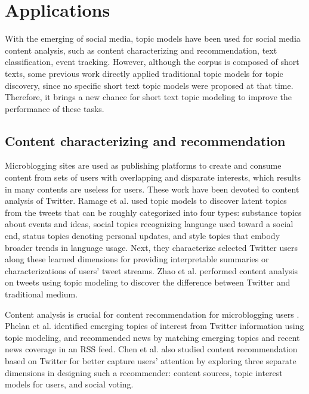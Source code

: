 \documentclass[10pt,journal,compsoc]{IEEEtran}
\begin{document}
{\section{Applications}

With the emerging of social media, topic models have been used for social media content analysis, such as content characterizing and recommendation, text classification, event tracking. However, although the corpus is composed of short texts, some previous work directly applied traditional topic models for topic discovery, since no specific short text topic models were proposed at that time. Therefore, it brings a new chance for short text topic modeling to improve the performance of these tasks.


\subsection{Content characterizing and recommendation}

Microblogging sites are used as publishing platforms to create and consume content from sets of users with overlapping and disparate interests, which results in many contents are useless for users. These work \cite{ramage2010characterizing,zhao2011comparing} have been devoted to content analysis of Twitter. Ramage et al. \cite{ramage2010characterizing} used topic models to discover latent topics from the tweets that can be roughly categorized into four types: substance topics about events and ideas, social topics recognizing language used toward a social end, status topics denoting personal updates, and style topics that embody broader trends in language usage. Next, they characterize selected Twitter users along these learned dimensions for providing interpretable summaries or characterizations of users’ tweet streams. Zhao et al. \cite{zhao2011comparing} performed content analysis on tweets using topic modeling to discover the difference between Twitter and traditional medium.

Content analysis is crucial for content recommendation for microblogging users \cite{guy2015social,qian2014personalized}. Phelan et al. \cite{phelan2009using} identified emerging topics of interest from Twitter information using topic modeling, and recommended news by matching emerging topics and recent news coverage in an RSS feed. Chen et al. \cite{chen2010shorttweet} also studied content recommendation based on Twitter for better capture users' attention by exploring three separate dimensions in designing such a recommender: content sources, topic interest models for users, and social voting.

}
\end{document}
